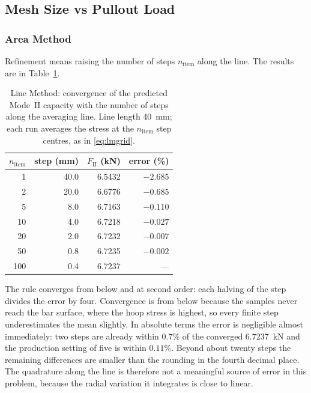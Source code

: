 \subsection{Mesh Size vs Pullout Load}
\label{sec:meshload}
 
\subsubsection*{Area Method}
 
Refinement means raising the number of steps $n_{\mathrm{item}}$ along the
line. The results are in Table~\ref{tab:sensline}.
 
\begin{table}[htbp]
\centering
\caption{Line Method: convergence of the predicted Mode~II capacity with the
         number of steps along the averaging line. Line length
         \SI{40}{\milli\metre}; each run averages the stress at the
         $n_{\mathrm{item}}$ step centres, as in \eqref{eq:lmgrid}.}
\label{tab:sensline}
\begin{tabular}{rrrr}
\toprule
$n_{\mathrm{item}}$ & step (\si{\milli\metre})
  & $F_{\mathrm{II}}$ (\si{\kilo\newton}) & error (\si{\percent}) \\
\midrule
  1 & 40.0 & 6.5432 & $-2.685$ \\
  2 & 20.0 & 6.6776 & $-0.685$ \\
  5 &  8.0 & 6.7163 & $-0.110$ \\
 10 &  4.0 & 6.7218 & $-0.027$ \\
 20 &  2.0 & 6.7232 & $-0.007$ \\
 50 &  0.8 & 6.7235 & $-0.002$ \\
100 &  0.4 & 6.7237 & ---      \\
\bottomrule
\end{tabular}
\end{table}
 
The rule converges from below and at second order: each halving of the step
divides the error by four. Convergence is from below because the samples never reach the bar
surface, where the hoop stress is highest, so every finite step
underestimates the mean slightly. In absolute terms the error is negligible
almost immediately: two steps are already within $0.7\%$ of the converged
\SI{6.7237}{\kilo\newton} and the production setting of five is within
$0.11\%$. Beyond about twenty steps the remaining differences are smaller
than the rounding in the fourth decimal place. The quadrature along the line
is therefore not a meaningful source of error in this problem, because the
radial variation it integrates is close to linear.
 
